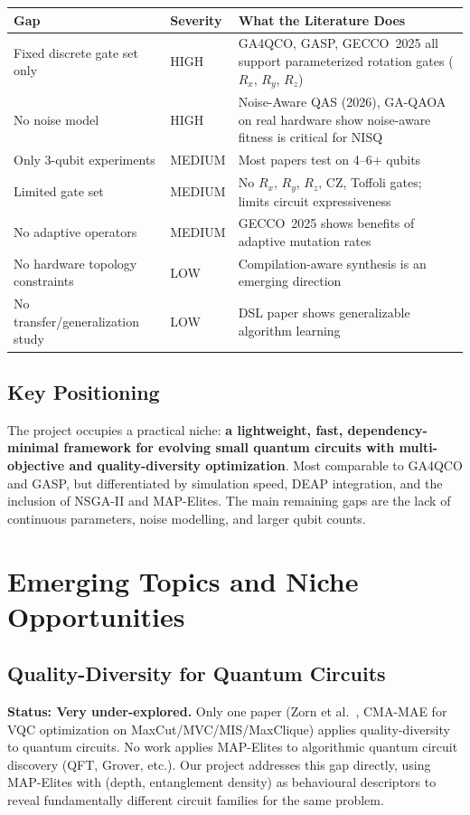 \documentclass[11pt]{article}
\begin{document}
\begin{longtable}{p{4cm} p{1.5cm} p{8.5cm}}
\toprule
\textbf{Gap} & \textbf{Severity} & \textbf{What the Literature Does} \\
\midrule
\endhead
Fixed discrete gate set only & HIGH & GA4QCO, GASP, GECCO~2025 all support parameterized rotation gates ($R_x$, $R_y$, $R_z$) \\
\addlinespace
No noise model & HIGH & Noise-Aware QAS (2026), GA-QAOA on real hardware show noise-aware fitness is critical for NISQ \\
\addlinespace
Only 3-qubit experiments & MEDIUM & Most papers test on 4--6+ qubits \\
\addlinespace
Limited gate set & MEDIUM & No $R_x$, $R_y$, $R_z$, CZ, Toffoli gates; limits circuit expressiveness \\
\addlinespace
No adaptive operators & MEDIUM & GECCO~2025 shows benefits of adaptive mutation rates \\
\addlinespace
No hardware topology constraints & LOW & Compilation-aware synthesis is an emerging direction \\
\addlinespace
No transfer/generalization study & LOW & DSL paper \cite{rouillard2025} shows generalizable algorithm learning \\
\bottomrule
\end{longtable}

\subsection{Key Positioning}

The project occupies a practical niche: \textbf{a lightweight, fast, dependency-minimal framework for evolving small quantum circuits with multi-objective and quality-diversity optimization}. Most comparable to GA4QCO and GASP, but differentiated by simulation speed, DEAP integration, and the inclusion of NSGA-II and MAP-Elites. The main remaining gaps are the lack of continuous parameters, noise modelling, and larger qubit counts.

\section{Emerging Topics and Niche Opportunities}
\label{sec:emerging}

\subsection{Quality-Diversity for Quantum Circuits}
\textbf{Status: Very under-explored.}
Only one paper (Zorn et al.\ \cite{zorn2025}, CMA-MAE for VQC optimization on MaxCut/MVC/MIS/MaxClique) applies quality-diversity to quantum circuits. No work applies MAP-Elites to algorithmic quantum circuit discovery (QFT, Grover, etc.).
Our project addresses this gap directly, using MAP-Elites with (depth, entanglement density) as behavioural descriptors to reveal fundamentally different circuit families for the same problem.
\end{document}
